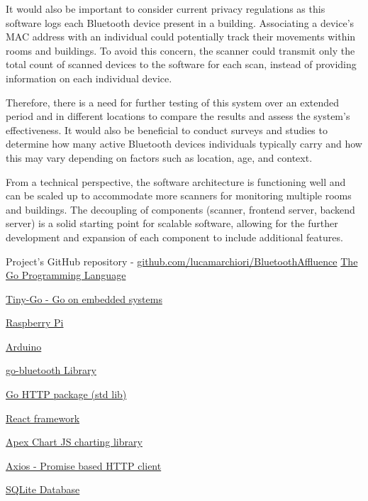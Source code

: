 \documentclass[a4paper, 11pt]{article}
\begin{document}
It would also be important to consider current privacy regulations as this software logs each Bluetooth device present in a building. Associating a device's MAC address with an individual could potentially track their movements within rooms and buildings. To avoid this concern, the scanner could transmit only the total count of scanned devices to the software for each scan, instead of providing information on each individual device.

Therefore, there is a need for further testing of this system over an extended period and in different locations to compare the results and assess the system's effectiveness. It would also be beneficial to conduct surveys and studies to determine how many active Bluetooth devices individuals typically carry and how this may vary depending on factors such as location, age, and context.

From a technical perspective, the software architecture is functioning well and can be scaled up to accommodate more scanners for monitoring multiple rooms and buildings. The decoupling of components (scanner, frontend server, backend server) is a solid starting point for scalable software, allowing for the further development and expansion of each component to include additional features.





\newpage
\begin{thebibliography}{9}
Project's GitHub repository - \href{https://github.com/lucamarchiori/BluetoothAffluence}{github.com/lucamarchiori/BluetoothAffluence}
\href{https://go.dev/}{The Go Programming Language}

\href{https://tinygo.org/}{Tiny-Go - Go on embedded systems}

\href{https://www.raspberrypi.com/documentation/computers/raspberry-pi.html}{Raspberry Pi}

\href{https://docs.arduino.cc/}{Arduino}

\href{https://pkg.go.dev/github.com/muka/go-bluetooth@v0.0.0-20221213043340-85dc80edc4e1#section-readme}{go-bluetooth Library}

\href{https://pkg.go.dev/net/http}{Go HTTP package (std lib)}

\href{https://react.dev/}{React framework}

\href{https://apexcharts.com/}{Apex Chart JS charting library}

\href{https://axios-http.com/}{Axios - Promise based HTTP client}

\href{https://www.sqlite.org/index.html}{SQLite Database}
\end{thebibliography}
\end{document}
